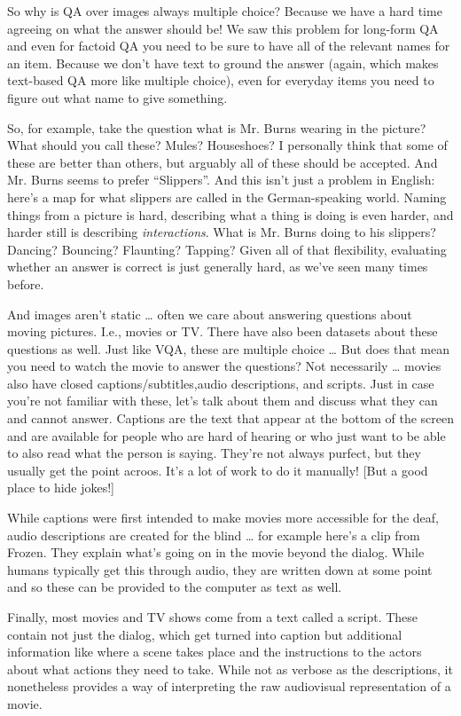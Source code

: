 So why is QA over images always multiple choice?  Because we have a hard time agreeing on what the answer should be!  We saw this problem for long-form QA and even for factoid QA you need to be sure to have all of the relevant names for an item.  Because we don’t have text to ground the answer (again, which makes text-based QA more like multiple choice), even for everyday items you need to figure out what name to give something. 

So, for example, take the question what is Mr. Burns wearing in the picture?  What should you call these?  Mules?  Houseshoes?  I personally think that some of these are better than others, but arguably all of these should be accepted.  And Mr. Burns seems to prefer “Slippers”.  And this isn’t just a problem in English: here’s a map for what slippers are called in the German-speaking world.  Naming things from a picture is hard, describing what a thing is doing is even harder, and harder still is describing \emph{interactions}.  What is Mr. Burns doing to his slippers?  Dancing? Bouncing? Flaunting? Tapping?  Given all of that flexibility, evaluating whether an answer is correct is just generally hard, as we’ve seen many times before.

And images aren’t static … often we care about answering questions about moving pictures.  I.e., movies or TV.  There have also been datasets about these questions as well.  Just like VQA, these are multiple choice … But does that mean you need to watch the movie to answer the questions?  Not necessarily … movies also have closed captions/subtitles,audio descriptions, and scripts.  Just in case you’re not familiar with these, let’s talk about them and discuss what they can and cannot answer.
Captions are the text that appear at the bottom of the screen and are available for people who are hard of hearing or who just want to be able to also read what the person is saying.  They’re not always purfect, but they usually get the point acroos.  It’s a lot of work to do it manually!  [But a good place to hide jokes!]

While captions were first intended to make movies more accessible for the deaf, audio descriptions are created for the blind … for example here’s a clip from Frozen.  They explain what’s going on in the movie beyond the dialog.  While humans typically get this through audio, they are written down at some point and so these can be provided to the computer as text as well.

Finally, most movies and TV shows come from a text called a script.  These contain not just the dialog, which get turned into caption but additional information like where a scene takes place and the instructions to the actors about what actions they need to take.  While not as verbose as the descriptions, it nonetheless provides a way of interpreting the raw audiovisual representation of a movie.

